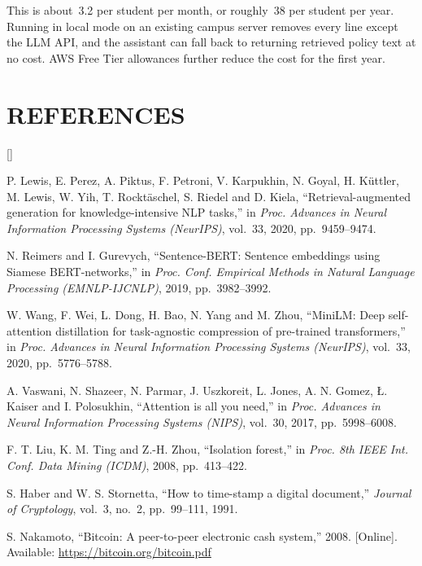 \documentclass[12pt,a4paper,oneside]{report}
\newcommand{\inr}{\rupee\,}
\begin{document}
This is about \inr3.2 per student per month, or roughly \inr38 per student per year. Running in local mode on an
existing campus server removes every line except the LLM API, and the assistant can fall back to returning retrieved
policy text at no cost. AWS Free Tier allowances further reduce the cost for the first year.

\chapter{REFERENCES}
\begin{list}{[]}{\setlength{\labelwidth}{2.2em}\setlength{\leftmargin}{2.8em}%
  \setlength{\labelsep}{0.6em}\setlength{\itemsep}{4pt}\setlength{\parsep}{0pt}}
\item P. Lewis, E. Perez, A. Piktus, F. Petroni, V. Karpukhin, N. Goyal, H. Küttler, M. Lewis, W. Yih, T. Rocktäschel, S. Riedel and D. Kiela, ``Retrieval-augmented generation for knowledge-intensive NLP tasks,'' in \emph{Proc. Advances in Neural Information Processing Systems (NeurIPS)}, vol.~33, 2020, pp.~9459--9474.
\item N. Reimers and I. Gurevych, ``Sentence-BERT: Sentence embeddings using Siamese BERT-networks,'' in \emph{Proc. Conf. Empirical Methods in Natural Language Processing (EMNLP-IJCNLP)}, 2019, pp.~3982--3992.
\item W. Wang, F. Wei, L. Dong, H. Bao, N. Yang and M. Zhou, ``MiniLM: Deep self-attention distillation for task-agnostic compression of pre-trained transformers,'' in \emph{Proc. Advances in Neural Information Processing Systems (NeurIPS)}, vol.~33, 2020, pp.~5776--5788.
\item A. Vaswani, N. Shazeer, N. Parmar, J. Uszkoreit, L. Jones, A. N. Gomez, Ł. Kaiser and I. Polosukhin, ``Attention is all you need,'' in \emph{Proc. Advances in Neural Information Processing Systems (NIPS)}, vol.~30, 2017, pp.~5998--6008.
\item F. T. Liu, K. M. Ting and Z.-H. Zhou, ``Isolation forest,'' in \emph{Proc. 8th IEEE Int. Conf. Data Mining (ICDM)}, 2008, pp.~413--422.
\item S. Haber and W. S. Stornetta, ``How to time-stamp a digital document,'' \emph{Journal of Cryptology}, vol.~3, no.~2, pp.~99--111, 1991.
\item S. Nakamoto, ``Bitcoin: A peer-to-peer electronic cash system,'' 2008. [Online]. Available: \url{https://bitcoin.org/bitcoin.pdf}

\end{list}
\end{document}
